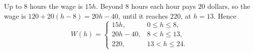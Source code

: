 Up to $8$ hours the wage is $15h$. Beyond $8$ hours each hour pays $20$ dollars, so the wage is $120+20(h-8)=20h-40$, until it reaches $220$, at $h=13$. Hence
\[\boxed{W(h)=\begin{cases}15h,&0\le h\le8,\\ 20h-40,&8<h\le13,\\ 220,&13<h\le24.\end{cases}}\]
